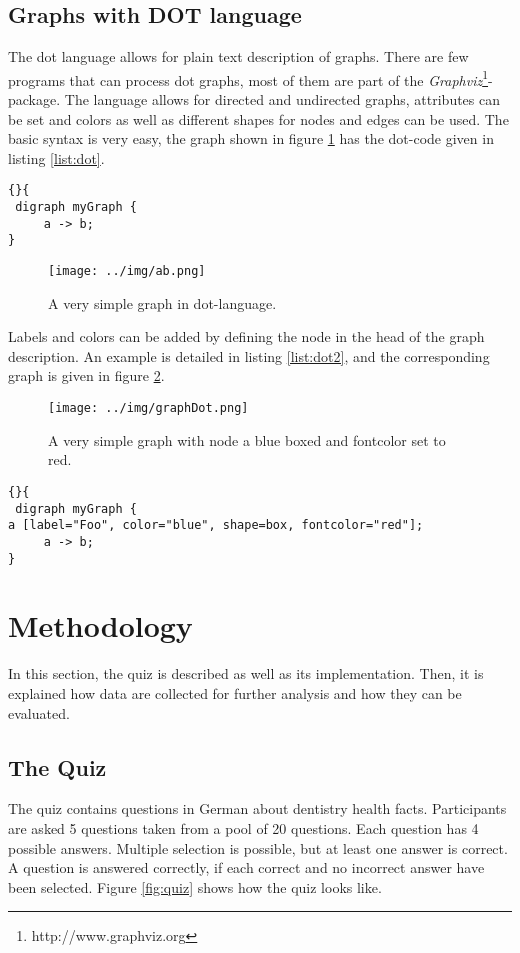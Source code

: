 \documentclass[preprint,12pt]{elsarticle}
\begin{document}
\subsection{Graphs with DOT language}
\label{sec:graph-repr-with}
The \ac{dot} language allows for plain text description of
graphs. There are few programs that can process \ac{dot} graphs, most
of them are part of the
\textit{Graphviz}\footnote{http://www.graphviz.org}-package. 
The language allows for directed and undirected graphs, attributes can
be set and colors as well as different shapes for nodes and edges can
be used. The basic syntax is very easy, the graph shown in figure
\ref{fig:dot} has the \ac{dot}-code given in listing \ref{list:dot}.

\begin{lstlisting}[caption=A very simple DOT-Graph,
  label=list:dot]{}{
 digraph myGraph {
     a -> b;
}
\end{lstlisting}

\begin{figure}
  \texttt{[image: ../img/ab.png]}
\caption{A very simple graph in \ac{dot}-language.}
\label{fig:dot}
\end{figure}

Labels and colors can be added by defining the node in the head of the
graph description. An example is detailed in listing \ref{list:dot2}, and
the corresponding graph is given in figure \ref{fig:dot2}.


\begin{figure}
  \texttt{[image: ../img/graphDot.png]}
\caption{A very simple graph with node a blue boxed and fontcolor set
  to red.}
\label{fig:dot2}
\end{figure}


\begin{lstlisting}[caption=A very simple DOT-Graph,
  label=list:dot2]{}{
 digraph myGraph {
a [label="Foo", color="blue", shape=box, fontcolor="red"];
     a -> b;
}
\end{lstlisting}


\section{Methodology}
\label{sec:method}
In this section, the quiz is described as well as its
implementation. Then, it is explained how data are collected for
further analysis and how they can be evaluated.

\subsection{The Quiz}
\label{sec:quiz}
The quiz contains questions in German about dentistry health facts. Participants are asked 5
questions taken from a pool of 20 questions. Each question has 4
possible answers. Multiple selection is possible, but at least one
answer is correct. A question is answered correctly, if each correct
and no incorrect answer have been selected. Figure \ref{fig:quiz}
shows how the quiz looks like. 
\end{document}
